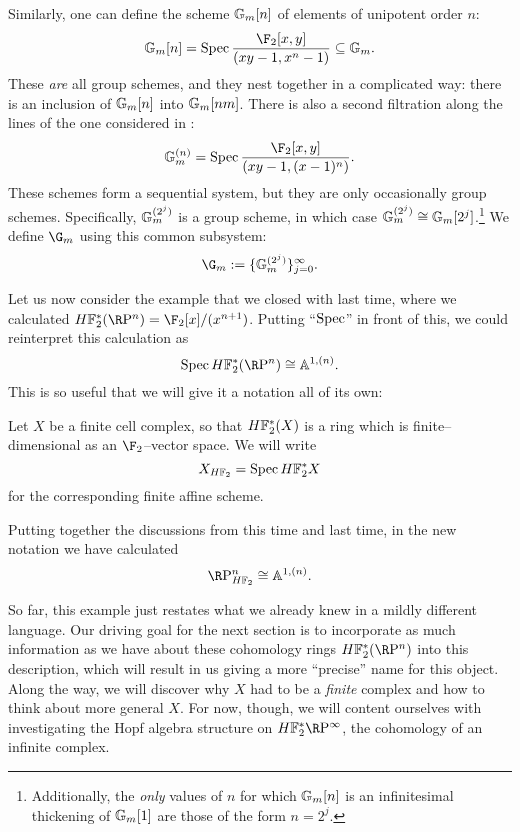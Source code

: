 \begin{example}
Similarly, one can define the scheme $\mathbb G_m[n]$ of elements of unipotent order $n$: \[\Gm[n] = \Spec \frac{\F_2[x,y]}{(xy - 1, x^n - 1)} \subseteq \Gm.\]  These \emph{are} all group schemes, and they nest together in a complicated way: there is an inclusion of $\mathbb G_m[n]$ into $\mathbb G_m[nm]$.  There is also a second filtration along the lines of the one considered in : \[\Gm^{(n)} = \Spec \frac{\F_2[x,y]}{(xy - 1, (x - 1)^n)}.\]  These schemes form a sequential system, but they are only occasionally group schemes.  Specifically, $\mathbb G_m^{(2^j)}$ is a group scheme, in which case $\mathbb G_m^{(2^j)} \cong \mathbb G_m[2^j]$.\footnote{Additionally, the \emph{only} values of $n$ for which $\mathbb G_m[n]$ is an infinitesimal thickening of $\mathbb G_m[1]$ are those of the form $n = 2^j$.}  We define $\G_m$ using this common subsystem: \[\G_m := \{\Gm^{(2^j)}\}_{j=0}^\infty.\]
\end{example}

Let us now consider the example that we closed with last time, where we calculated $\HFtwo^*(\RP^n) = \F_2[x] / (x^{n+1})$.  Putting ``$\operatorname{Spec}$'' in front of this, we could reinterpret this calculation as \[\Spec \HFtwo^*(\RP^n) \cong \mathbb A^{1, (n)}.\]  This is so useful that we will give it a notation all of its own:

\begin{definition}\label{HF2SchemeForFiniteCplx}
Let $X$ be a finite cell complex, so that $\HFtwo^*(X)$ is a ring which is finite--dimensional as an $\F_2$--vector space.  We will write \[X_{\HFtwo} = \Spec \HFtwo^* X\] for the corresponding finite affine scheme.
\end{definition}

\begin{example}
Putting together the discussions from this time and last time, in the new notation we have calculated \[\RP^n_{\HFtwo} \cong \mathbb A^{1, (n)}.\]
\end{example}

So far, this example just restates what we already knew in a mildly different language.  Our driving goal for the next section is to incorporate as much information as we have about these cohomology rings $\HFtwo^* (\RP^n)$ into this description, which will result in us giving a more ``precise'' name for this object.  Along the way, we will discover why $X$ had to be a \emph{finite} complex and how to think about more general $X$.  For now, though, we will content ourselves with investigating the Hopf algebra structure on $\HFtwo^* \RP^\infty$, the cohomology of an infinite complex.


